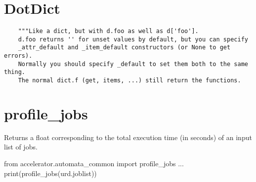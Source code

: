 \section{DotDict}
\begin{verbatim}
    """Like a dict, but with d.foo as well as d['foo'].
    d.foo returns '' for unset values by default, but you can specify
    _attr_default and _item_default constructors (or None to get errors).
    Normally you should specify _default to set them both to the same thing.
    The normal dict.f (get, items, ...) still return the functions.
\end{verbatim}



\section{profile\_jobs}
Returns a float corresponding to the total execution time (in seconds)
of an input list of jobs.
\begin{python}
from accelerator.automata_common import profile_jobs
...
print(profile_jobs(urd.joblist))
\end{python}
